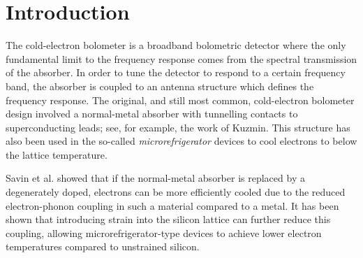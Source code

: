 \documentclass[final]{svjour2}
\begin{document}
\section{Introduction}
\par 
The cold-electron bolometer is a broadband bolometric detector where the only fundamental limit to the frequency response comes from the spectral transmission of the absorber. In order to tune the detector to respond to a certain frequency band, the absorber is coupled to an antenna structure which defines the frequency response.%
The original, and still most common, cold-electron bolometer design involved a normal-metal absorber with tunnelling contacts to superconducting leads; see, for example, the work of Kuzmin.\cite{Kuzmin2001} This structure has also been used in the so-called \textit{microrefrigerator} devices to cool electrons to below the lattice temperature.
\par 
Savin et al.\cite{Savin2001} showed that if the normal-metal absorber is replaced by a degenerately doped, electrons can be more efficiently cooled due to the reduced electron-phonon coupling in such a material compared to a metal.\cite{Leoni1999} It has been shown that introducing strain into the silicon lattice can further reduce this coupling, allowing microrefrigerator-type devices to achieve lower electron temperatures compared to unstrained silicon.\cite{Prest2011}
\par
\end{document}
